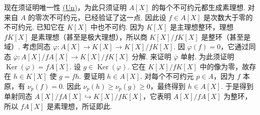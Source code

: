现在须证明唯一性 \hyperlink{galois-factorization-un}{(Un)}，为此只须证明 $A[X]$ 的每个不可约元都生成素理想. 对来自 $A$ 的零次不可约元，已经验证了这一点. 因此设 $f\in A[X]$ 是次数大于零的不可约元. 已知它在 $K[X]$ 中也不可约. 因为 $K[X]$ 是主理想整环，理想 $fK[X]$ 是素理想（甚至是极大理想），所以商 $K[X]/fK[X]$ 是整环（甚至是域）. 考虑同态 $\varphi:A[X]\longrightarrow K[X]\longrightarrow K[X]/fK[X]$. 因 $\varphi(f)=0$，它通过同态 $\overline\varphi:A[X]/fA[X]\longrightarrow K[X]/fK[X]$ 分解. 来证明 $\overline\varphi$ 单射. 为此须证明 $\operatorname{Ker}(\varphi)=fA[X]$. 设 $g\in\operatorname{Ker}(\varphi)$. 它在 $K[X]/fK[X]$ 中的像为零，故存在 $h\in K[X]$ 使 $g=fh$. 要证明 $h\in A[X]$. 对每个不可约元 $p\in A$，因为 $f$ 本原，有 $\nu_p(f)=0$. 因此 $\nu_p(h)\geqslant\nu_p(g)\geqslant0$，最终得到 $h\in A[X]$. 于是得到单射同态 $A[X]/fA[X]\hookrightarrow K[X]/fK[X]$，它表明 $A[X]/fA[X]$ 为整环，所以 $fA[X]$ 是素理想，所证即此.

